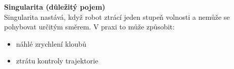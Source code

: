 \documentclass[a4paper,10pt]{article}
\begin{document}
\begin{vysvetlenibox}
\textbf{Singularita (důležitý pojem)}\\
Singularita nastává, když robot ztrácí jeden stupeň volnosti
a nemůže se pohybovat určitým směrem.
V praxi to může způsobit:
\begin{itemize}[noitemsep]
    \item náhlé zrychlení kloubů
    \item ztrátu kontroly trajektorie
\end{itemize}

\end{vysvetlenibox}


\end{document}
